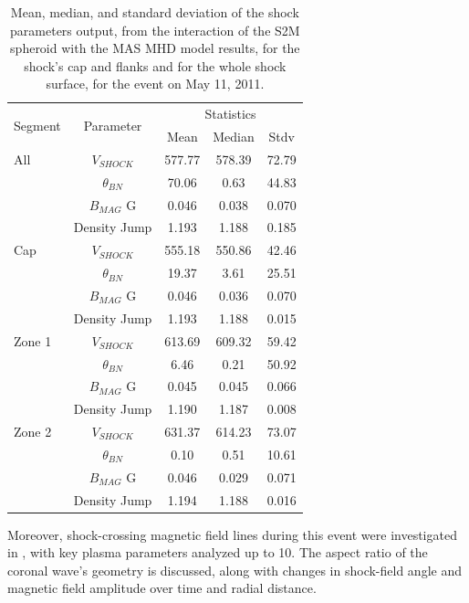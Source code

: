 \begin{table}[!htp] %
	\centering
	\caption{Mean, median, and standard deviation of the shock parameters output, from the interaction of the S2M spheroid with the MAS MHD model results, for the shock's cap and flanks and for the whole shock surface, for the event on May 11, 2011.}
	\label{T_sh_param_110511}
	\begin{tabular}{lcccc}
		\hline
		\multirow{2}{*}{Segment} & \multirow{2}{*}{Parameter} & \multicolumn{3}{c}{Statistics} \\
		&                         & Mean & Median & Stdv \\ \hline
		All & $V_{SHOCK}$ \kms    & 577.77 & 578.39 & 72.79 \\ 
		& $\theta_{BN}$ \degree   & 70.06 & 0.63 & 44.83 \\ 
		& $B_{MAG}$ G             & 0.046 & 0.038 & 0.070 \\ 
		& Density Jump            & 1.193 & 1.188 & 0.185 \\ \hline
		
		Cap & $V_{SHOCK}$ \kms    & 555.18 & 550.86 & 42.46 \\ 
		& $\theta_{BN}$ \degree   & 19.37 & 3.61 & 25.51 \\ 
		& $B_{MAG}$ G             & 0.046 & 0.036 & 0.070 \\ 
		& Density Jump            & 1.193 & 1.188 & 0.015 \\ \hline
		
		Zone 1 & $V_{SHOCK}$ \kms & 613.69 & 609.32 & 59.42 \\ 
		& $\theta_{BN}$ \degree   & 6.46 & 0.21 & 50.92 \\ 
		& $B_{MAG}$ G             & 0.045 & 0.045 & 0.066 \\ 
		& Density Jump            & 1.190 & 1.187 & 0.008 \\ \hline
		
		Zone 2 & $V_{SHOCK}$ \kms & 631.37 & 614.23 & 73.07 \\ 
		& $\theta_{BN}$ \degree   & 0.10 & 0.51 & 10.61 \\ 
		& $B_{MAG}$ G             & 0.046 & 0.029 & 0.071 \\ 
		& Density Jump            & 1.194 & 1.188 & 0.016 \\ \hline
	\end{tabular}
\end{table}

Moreover, shock-crossing magnetic field lines during this event were investigated in \citep{kozarev_2022}, with key plasma parameters analyzed up to 10\rsun. The aspect ratio of the coronal wave's geometry is discussed, along with changes in shock-field angle and magnetic field amplitude over time and radial distance.

